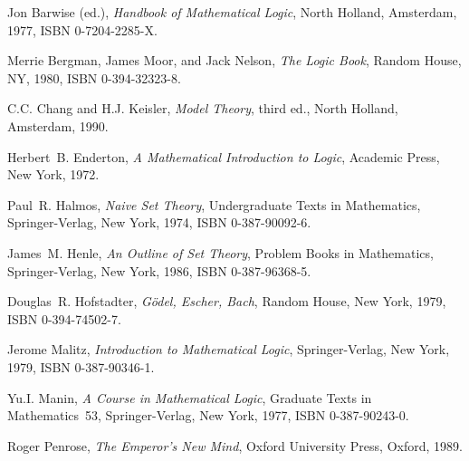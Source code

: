 \documentclass[12pt]{amsbook}
\theoremstyle{plain}
\theoremstyle{definition}
\theoremstyle{remark}
\begin{document}
\begin{thebibliography}{99}

Jon Barwise (ed.), {\em Handbook of Mathematical Logic\/}, North Holland,
Amsterdam, 1977, ISBN 0-7204-2285-X.

Merrie Bergman,  James Moor,  and Jack Nelson,  {\em The Logic Book\/}, 
Random House,  NY,  1980,  ISBN 0-394-32323-8.

C.C. Chang and H.J. Keisler, {\em Model Theory\/}, third ed., North
Holland, Amsterdam, 1990.

Herbert~B. Enderton, {\em A Mathematical Introduction to Logic\/},
Academic Press, New York, 1972.

Paul~R. Halmos, {\em Naive Set Theory\/}, Undergraduate Texts in
Mathematics, Springer-Verlag, New York, 1974, ISBN 0-387-90092-6.

James~M. Henle, {\em An Outline of Set Theory\/}, Problem Books in
Mathematics, Springer-Verlag, New York, 1986, ISBN 0-387-96368-5.

Douglas~R. Hofstadter, {\em G\"odel, Escher, Bach\/}, Random House, New
York, 1979, ISBN 0-394-74502-7.

Jerome Malitz, {\em Introduction to Mathematical Logic\/},
Springer-Verlag, New York, 1979, ISBN 0-387-90346-1.

Yu.I. Manin, {\em A Course in Mathematical Logic\/}, Graduate Texts in
Mathematics~53, Springer-Verlag, New York, 1977, ISBN 0-387-90243-0.

Roger Penrose, {\em The Emperor's New Mind}, Oxford University Press,
Oxford, 1989.

\end{thebibliography}



%
%
\end{document}
